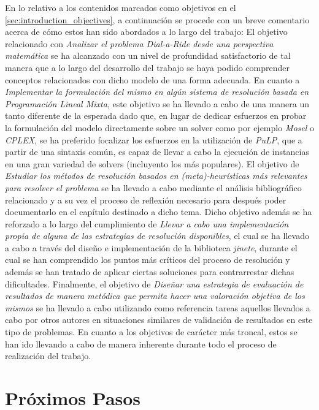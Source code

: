 \documentclass{subfiles}
\begin{document}
      En lo relativo a los contenidos marcados como objetivos en el \cref{sec:introduction_objectives}, a continuación se procede con un breve comentario acerca de cómo estos han sido abordados a lo largo del trabajo: El objetivo relacionado con \emph{Analizar el problema Dial-a-Ride desde una perspectiva matemática} se ha alcanzado con un nivel de profundidad satisfactorio de tal manera que a lo largo del desarrollo del trabajo se haya podido comprender conceptos relacionados con dicho modelo de una forma adecuada. En cuanto a \emph{Implementar la formulación del mismo en algún sistema de resolución basada en Programación Lineal Mixta}, este objetivo se ha llevado a cabo de una manera un tanto diferente de la esperada dado que, en lugar de dedicar esfuerzos en probar la formulación del modelo directamente sobre un solver como por ejemplo \emph{Mosel} o \emph{CPLEX}, se ha preferido focalizar los esfuerzos en la utilización de \emph{PuLP}, que a partir de una sintaxis común, es capaz de llevar a cabo la ejecución de instancias en una gran variedad de solvers (incluyento los más populares). El objetivo de \emph{Estudiar los métodos de resolución basados en (meta)-heurísticas más relevantes para resolver el problema} se ha llevado a cabo mediante el análisis bibliográfico relacionado y a su vez el proceso de reflexión necesario para después poder documentarlo en el capítulo destinado a dicho tema. Dicho objetivo además se ha reforzado a lo largo del cumplimiento de \emph{Llevar a cabo una implementación propia de alguna de las estrategias de resolución disponibles}, el cual se ha llevado a cabo a través del diseño e implementación de la biblioteca \emph{jinete}, durante el cual se han comprendido los puntos más críticos del proceso de resolución y además se han tratado de aplicar ciertas soluciones para contrarrestar dichas dificultades. Finalmente, el objetivo de \emph{Diseñar una estrategia de evaluación de resultados de manera metódica que permita hacer una valoración objetiva de los mismos} se ha llevado a cabo utilizando como referencia tareas aquellos llevados a cabo por otros autores en situaciones similares de validación de resultados en este tipo de problemas. En cuanto a los objetivos de carácter más troncal, estos se han ido llevando a cabo de manera inherente durante todo el proceso de realización del trabajo.

    \section{Próximos Pasos}
    \label{sec:conclusion_next_steps}
\end{document}
